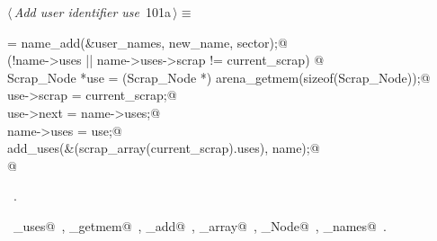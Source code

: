 \documentclass[a4paper]{report}
\begin{document}
\begin{flushleft} \small
\begin{minipage}{\linewidth}\label{scrap208}\raggedright\small
{} $\langle\,${\it Add user identifier use}\nobreak\ {\footnotesize {101a}}$\,\rangle\equiv$
\vspace{-1ex}
\begin{list}{}{} \item
\mbox{}\verb@name = name_add(&user_names, new_name, sector);@\\
\mbox{}\verb@if (!name->uses || name->uses->scrap != current_scrap) {@\\
\mbox{}\verb@  Scrap_Node *use = (Scrap_Node *) arena_getmem(sizeof(Scrap_Node));@\\
\mbox{}\verb@  use->scrap = current_scrap;@\\
\mbox{}\verb@  use->next = name->uses;@\\
\mbox{}\verb@  name->uses = use;@\\
\mbox{}\verb@  add_uses(&(scrap_array(current_scrap).uses), name);@\\
\mbox{}\verb@}@{\NWsep}
\end{list}
\vspace{-1.5ex}
\footnotesize
\begin{list}{}{\setlength{\itemsep}{-\parsep}\setlength{\itemindent}{-\leftmargin}}
\item \NWtxtMacroRefIn\ .
\item \NWtxtIdentsUsed\nobreak\  \verb@add_uses@\nobreak\ , \verb@arena_getmem@\nobreak\ , \verb@name_add@\nobreak\ , \verb@scrap_array@\nobreak\ , \verb@Scrap_Node@\nobreak\ , \verb@user_names@\nobreak\ .
\item{}
\end{list}
\end{minipage}\vspace{4ex}
\end{flushleft}
\end{document}
